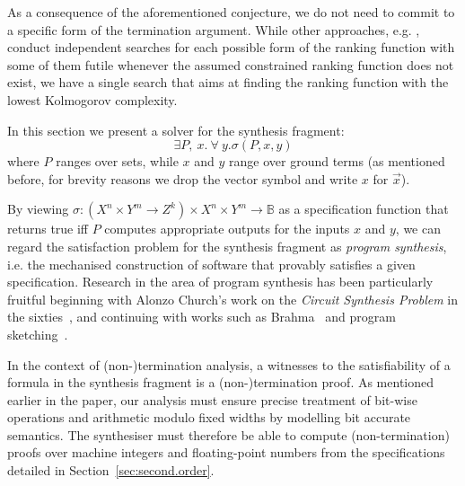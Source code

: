 \documentclass[preprint]{sigplanconf}
\theoremstyle{definition}
\newcommand{\todo}[1]{{\bf TODO:} #1}
\begin{document}
As a consequence of the aforementioned conjecture, we do not need to commit
to a specific form of the termination argument.  While other approaches,
e.g.  \cite{DBLP:conf/tacas/LeikeH14}, conduct independent searches for each
possible form of the ranking function with some of them futile whenever the
assumed constrained ranking function does not exist, we have a single search
that aims at finding the ranking function with the lowest Kolmogorov
complexity.
%
\fi
%
%




In this section we present a solver for the synthesis fragment:
 \[
  \exists P,~ x . ~\forall~ y . \sigma(P, x, y)
 \]
%
where $P$ ranges over sets, while $x$ and $y$ range over ground terms (as mentioned before, for brevity reasons we drop
 the vector symbol and write  $x$ for $\vec{x}$).

By viewing $\sigma: (X^n \times Y^m \to Z^k) \times X^n \times Y^m  \to
\mathbb{B}$ as a specification function that returns true iff $P$ computes
appropriate outputs for the inputs $x$ and $y$, we can regard the
satisfaction problem for the synthesis fragment as \emph{program synthesis},
i.e.  the mechanised construction of software that provably satisfies a
given specification.  Research in the area of program synthesis has been
particularly fruitful beginning with Alonzo Church's work on the
\emph{Circuit Synthesis Problem} in the sixties~\cite{church-synth}, and
continuing with works such as {\sc Brahma}~\cite{brahma} and program
sketching~\cite{lezama-thesis,sketch,modular-sketch}.

% 
  



In the context of (non-)termination analysis, a witnesses to the satisfiability of a formula in the synthesis fragment 
is a (non-)termination proof. 
As mentioned earlier in the paper, our analysis must ensure precise treatment of bit-wise operations and arithmetic modulo fixed widths
by modelling bit accurate semantics.
The synthesiser must therefore be able to compute (non-termination) proofs 
over machine integers and floating-point numbers from the specifications detailed in Section~\ref{sec:second.order}.
\end{document}
